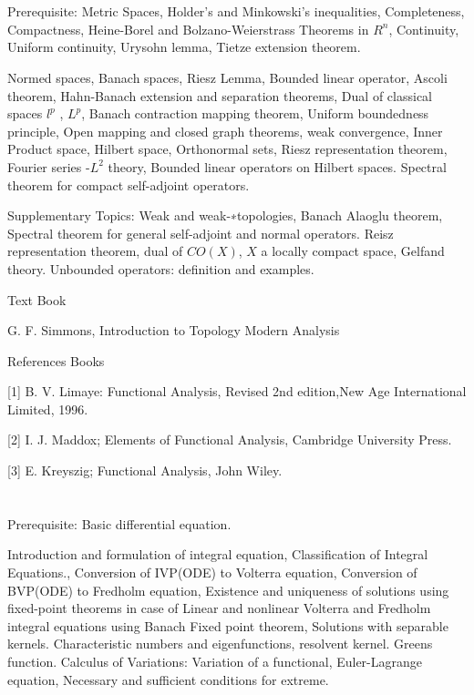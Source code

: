 \section{\courseinfo}

Prerequisite: Metric Spaces, Holder’s and Minkowski’s inequalities, Completeness, Compactness, Heine-Borel and Bolzano-Weierstrass Theorems in $R^n$, Continuity, Uniform continuity, Urysohn lemma, Tietze extension theorem.

Normed spaces, Banach spaces, Riesz Lemma, Bounded linear operator, Ascoli theorem, Hahn-Banach extension and separation theorems, Dual of classical spaces $l^p$ , $L^p$,  Banach contraction mapping theorem, Uniform boundedness principle, Open mapping and closed graph theorems, weak convergence, Inner Product space, Hilbert space, Orthonormal sets, Riesz representation theorem, Fourier series -$L^2$ theory, Bounded linear operators on Hilbert spaces. Spectral theorem for compact self-adjoint operators.

Supplementary Topics: Weak and weak-∗topologies, Banach Alaoglu theorem, Spectral theorem for general self-adjoint and normal operators. Reisz representation theorem, dual of $CO(X)$, $X$ a locally compact space, Gelfand theory. Unbounded operators: definition and examples.

Text Book

G. F. Simmons, Introduction to Topology Modern Analysis

References Books

[1] B. V. Limaye: Functional Analysis, Revised 2nd edition,New Age International Limited, 1996.

[2] I. J. Maddox; Elements of Functional Analysis, Cambridge University Press.

[3] E. Kreyszig; Functional  Analysis, John Wiley.

\section{\courseinfo}

Prerequisite: Basic differential equation. 

Introduction and formulation of integral equation, Classification of Integral Equations., Conversion of IVP(ODE) to Volterra equation, Conversion of BVP(ODE) to Fredholm equation, Existence and uniqueness of solutions using fixed-point theorems in case of Linear and nonlinear Volterra and Fredholm integral equations using Banach Fixed point theorem, Solutions with separable kernels. Characteristic numbers and eigenfunctions, resolvent kernel. Greens function. Calculus of Variations: Variation of a functional, Euler-Lagrange equation, Necessary and sufficient conditions for extreme.

